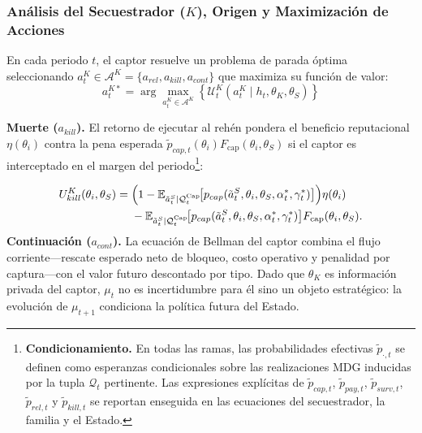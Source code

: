 \documentclass[12pt]{article}
\theoremstyle{definition}
\theoremstyle{remark}
\newcommand{\E}{\mathbb{E}}
\newcommand{\1}{\mathbf{1}}
\begin{document}
\subsubsection[Análisis del secuestrador K]{Análisis del Secuestrador ($K$), Origen y Maximización de Acciones}
En cada periodo $t$, el captor resuelve un problema de parada óptima seleccionando $a^K_t\in\mathcal{A}^K=\{a_{rel},a_{kill},a_{cont}\}$ que maximiza su función de valor:
\begin{equation}
\label{eq:kidnapper-argmax}
    a_t^{K\ast} = \arg \max_{a^K_t \in \mathcal{A}^K} \left\{ \mathcal{U}^K_t(a^K_t \mid h_t, \theta_K, \theta_S) \right\}
\end{equation}

\noindent \textbf{Muerte ($a_{kill}$).} El retorno de ejecutar al rehén pondera el beneficio reputacional $\eta(\theta_i)$ contra la pena esperada $\tilde{p}_{cap,t}(\theta_i)F_{\mathrm{cap}}(\theta_i,\theta_S)$ si el captor es interceptado en el margen del periodo\footnote{\textbf{Condicionamiento.} En todas las ramas, las probabilidades efectivas $\tilde p_{\cdot,t}$ se definen como esperanzas condicionales sobre las realizaciones MDG inducidas por la tupla $\mathcal Q_t$ pertinente. Las expresiones explícitas de $\tilde p_{cap,t}$, $\tilde p_{pay,t}$, $\tilde p_{surv,t}$, $\tilde p_{rel,t}$ y $\tilde p_{kill,t}$ se reportan enseguida en las ecuaciones del secuestrador, la familia y el Estado.}:

\begin{equation}
\label{eq:kidnapper-kill}
\begin{split}
U^K_{kill}(\theta_i, \theta_S)
={}& \Bigl(1-\E_{\tilde a_t^S\mid \mathcal Q_t^{\mathrm{Cap}}}\!\bigl[
      p_{cap}(\tilde a_t^S,\theta_i,\theta_S,\alpha_t^\ast,\gamma_t^\ast)
    \bigr]\Bigr)\eta(\theta_i) \\
&{}-\E_{\tilde a_t^S\mid \mathcal Q_t^{\mathrm{Cap}}}\!\bigl[
      p_{cap}(\tilde a_t^S,\theta_i,\theta_S,\alpha_t^\ast,\gamma_t^\ast)
    \bigr]F_{\mathrm{cap}}(\theta_i,\theta_S).
\end{split}
\end{equation}
\noindent \textbf{Continuación ($a_{cont}$).} La ecuación de Bellman del captor combina el flujo corriente---rescate esperado neto de bloqueo, costo operativo y penalidad por captura---con el valor futuro descontado por tipo. Dado que $\theta_K$ es información privada del captor, $\mu_t$ no es incertidumbre para él sino un objeto estratégico: la evolución de $\mu_{t+1}$ condiciona la política futura del Estado.
\end{document}
